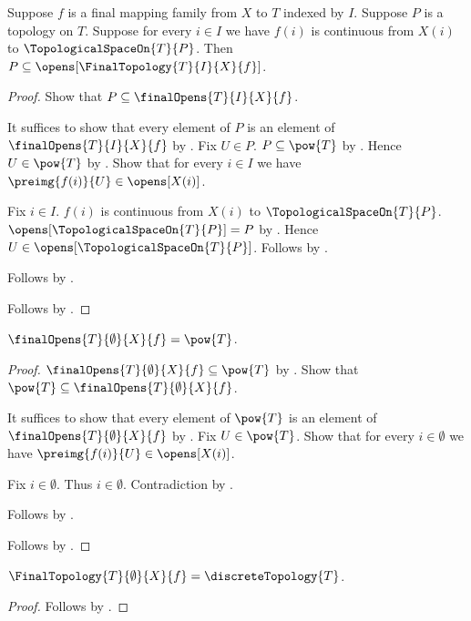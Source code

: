 \begin{theorem}\label{final_topology_is_finest}
    Suppose $f$ is a final mapping family from $X$ to $T$ indexed by $I$.
    Suppose $P$ is a topology on $T$.
    Suppose for every $i\in I$ we have
        $f(i)$ is continuous from $X(i)$ to $\TopologicalSpaceOn{T}{P}$.
    Then $P\subseteq\opens[\FinalTopology{T}{I}{X}{f}]$.
\end{theorem}
\begin{proof}
    Show that $P\subseteq\finalOpens{T}{I}{X}{f}$.
    \begin{subproof}
        It suffices to show that every element of $P$ is an element of
            $\finalOpens{T}{I}{X}{f}$ by .
        Fix $U\in P$.
        $P\subseteq\pow{T}$ by .
        Hence $U\in\pow{T}$ by .
        Show that for every $i\in I$ we have
            $\preimg{f(i)}{U}\in\opens[X(i)]$.
        \begin{subproof}
            Fix $i\in I$.
            $f(i)$ is continuous from $X(i)$ to
                $\TopologicalSpaceOn{T}{P}$.
            $\opens[\TopologicalSpaceOn{T}{P}]=P$ by
                .
            Hence $U\in\opens[\TopologicalSpaceOn{T}{P}]$.
            Follows by .
        \end{subproof}
        Follows by .
    \end{subproof}
    Follows by .
\end{proof}

\begin{proposition}\label{empty_final_opens}
    $\finalOpens{T}{\emptyset}{X}{f}=\pow{T}$.
\end{proposition}
\begin{proof}
    $\finalOpens{T}{\emptyset}{X}{f}\subseteq\pow{T}$ by
        .
    Show that $\pow{T}\subseteq\finalOpens{T}{\emptyset}{X}{f}$.
    \begin{subproof}
        It suffices to show that every element of $\pow{T}$ is an element of
            $\finalOpens{T}{\emptyset}{X}{f}$ by .
        Fix $U\in\pow{T}$.
        Show that for every $i\in\emptyset$ we have
            $\preimg{f(i)}{U}\in\opens[X(i)]$.
        \begin{subproof}
            Fix $i\in\emptyset$.
            Thus $i\in\emptyset$.
            Contradiction by .
        \end{subproof}
        Follows by .
    \end{subproof}
    Follows by .
\end{proof}

\begin{theorem}\label{empty_final_topology_is_discrete}
    $\FinalTopology{T}{\emptyset}{X}{f}=\discreteTopology{T}$.
\end{theorem}
\begin{proof}
    Follows by
        .
\end{proof}

